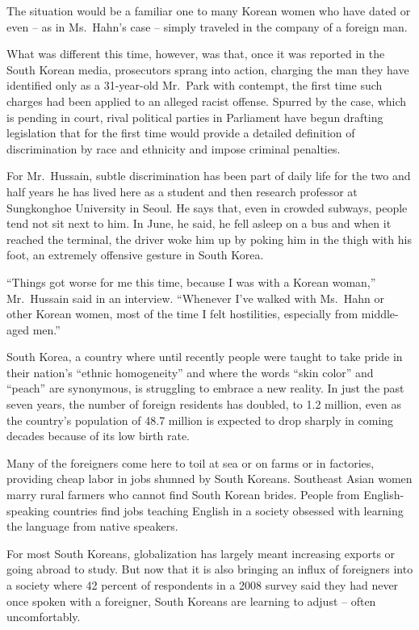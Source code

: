 ﻿\documentclass[12pt]{article}
\begin{document}
The situation would be a familiar one to many Korean women who have dated or even -- as in
Ms.~Hahn's case -- simply traveled in the company of a foreign man.

What was different this time, however, was that, once it was reported in the South Korean media,
prosecutors sprang into action, charging the man they have identified only as a 31-year-old Mr.~Park
with contempt, the first time such charges had been applied to an alleged racist offense. Spurred by
the case, which is pending in court, rival political parties in Parliament have begun drafting
legislation that for the first time would provide a detailed definition of discrimination by race
and ethnicity and impose criminal penalties.

For Mr.~Hussain, subtle discrimination has been part of daily life for the two and half years he has
lived here as a student and then research professor at Sungkonghoe University in Seoul. He says
that, even in crowded subways, people tend not sit next to him. In June, he said, he fell asleep on
a bus and when it reached the terminal, the driver woke him up by poking him in the thigh with his
foot, an extremely offensive gesture in South Korea.

``Things got worse for me this time, because I was with a Korean woman,'' Mr.~Hussain said in an
interview. ``Whenever I've walked with Ms.~Hahn or other Korean women, most of the time I felt
hostilities, especially from middle-aged men.''

South Korea, a country where until recently people were taught to take pride in their nation's
``ethnic homogeneity'' and where the words ``skin color'' and ``peach'' are synonymous, is
struggling to embrace a new reality. In just the past seven years, the number of foreign residents
has doubled, to 1.2 million, even as the country's population of 48.7 million is expected to drop
sharply in coming decades because of its low birth rate.

Many of the foreigners come here to toil at sea or on farms or in factories, providing cheap labor
in jobs shunned by South Koreans. Southeast Asian women marry rural farmers who cannot find South
Korean brides. People from English-speaking countries find jobs teaching English in a society
obsessed with learning the language from native speakers.

For most South Koreans, globalization has largely meant increasing exports or going abroad to study.
But now that it is also bringing an influx of foreigners into a society where 42 percent of
respondents in a 2008 survey said they had never once spoken with a foreigner, South Koreans are
learning to adjust -- often uncomfortably.
\end{document}
